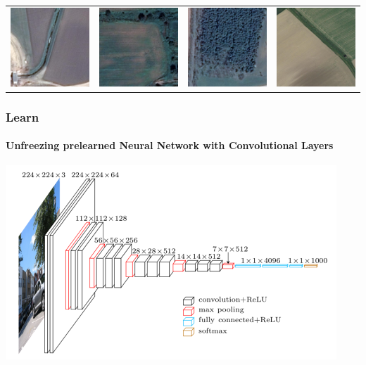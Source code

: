 \documentclass[color=usenames,dvipsnames]{beamer}
\begin{document}
\begin{frame}
\begin{table}[ht]
\centering
\begin{tabular}{cccc}
\includegraphics[width=0.2\linewidth]{../figures/no_wt_at_1.png}&
\includegraphics[width=0.2\linewidth]{../figures/no_wt_at_2.png}&
\includegraphics[width=0.2\linewidth]{../figures/no_wt_at_3.png}&
\includegraphics[width=0.2\linewidth]{../figures/no_wt_at_4.png}\\
\end{tabular}
\end{table}






\end{frame}


\begin{frame}
\frametitle{Learn}
\framesubtitle{Unfreezing prelearned Neural Network with Convolutional Layers}

\begin{center}
\includegraphics[width=0.8\linewidth]{../figures/vgg16.png}
\end{center}

\end{frame}
\end{document}
